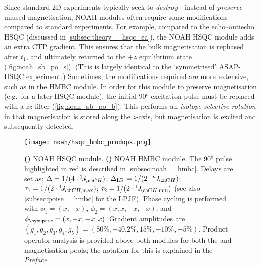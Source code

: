Since standard 2D experiments typically seek to \textit{destroy}---instead of \textit{preserve}---unused magnetisation, NOAH modules often require some modifications compared to standard experiments.
For example, compared to the echo--antiecho HSQC (discussed in \cref{subsec:theory__hsqc_ea}), the NOAH HSQC module\autocite{Kupce2017ACIE} adds an extra CTP gradient.
This ensures that the bulk magnetisation is rephased after $t_1$, and ultimately returned to the $+z$ equilibrium state (\cref{fig:noah_sb_po_s}).
(This is largely identical to the `symmetrised' ASAP-HSQC experiment\autocite{SchulzeSunninghausen2017JMR}.)
Sometimes, the modifications required are more extensive, such as in the HMBC module.
In order for this module to preserve  magnetisation (e.g.\ for a later HSQC module), the initial \ang{90} excitation pulse must be replaced with a $zz$-filter (\cref{fig:noah_sb_po_b}).
This performs an \textit{isotope-selective rotation} in that  magnetisation is stored along the $z$-axis, but  magnetisation is excited and subsequently detected.

\begin{figure}[htb]
    \centering
    \texttt{[image: noah/hsqc\_hmbc\_prodops.png]}%
    {\label{fig:noah_sb_po_s}}%
    {\label{fig:noah_sb_po_b}}%
    \caption[NOAH HSQC and HMBC modules with product operator analysis]{
        \textbf{()} 
        NOAH HSQC module.
        \textbf{()} 
        NOAH HMBC module.
        The \ang{90} pulse highlighted in red is described in \cref{subsec:noah__hmbc}.
        Delays are set as: $\Delta = 1 / (4 \cdot \oneJ{CH})$; $\Delta_\text{LR} = 1 / (2 \cdot \nJ{CH})$; $\tau_1 = 1 / (2 \cdot \oneJ{CH,\text{max}})$; $\tau_2 = 1 / (2 \cdot \oneJ{CH,\text{min}})$ (see also \cref{subsec:poise__hmbc} for the LPJF).
        Phase cycling is performed with $\phi_1 = (x, -x)$, $\phi_2 = (x, x, -x, -x)$, and $\phirec = (x, -x, -x, x)$.
        Gradient amplitudes are $(g_1, g_2, g_3, g_4, g_5) = (80\%, \pm 40.2\%, 15\%, -10\%, -5\%)$.
        Product operator analysis is provided above both modules for both the  and  magnetisation pools; the notation for this is explained in the \textit{Preface}.
    }
    \label{fig:noah_sb_po}
\end{figure}

